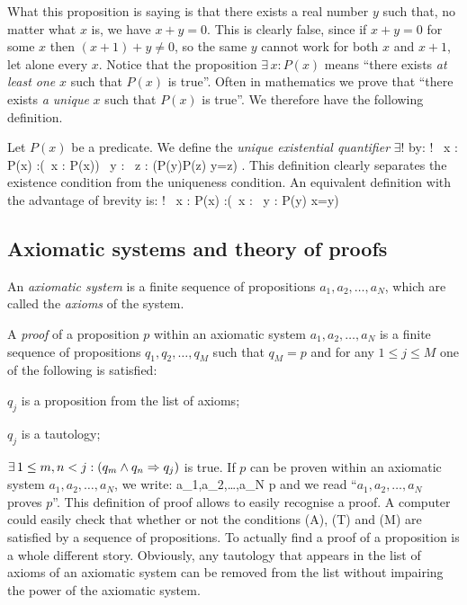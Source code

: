 What this proposition is saying is that there exists a real number $y$ such that, no matter what $x$ is, we have $x+y=0$.
This is clearly false, since if $x+y=0$ for some $x$ then $(x+1)+y\neq 0$, so the same $y$ cannot work for both $x$ and $x+1$, let alone every $x$.
\ee
Notice that the proposition $\exists \, x : P(x)$ means ``there exists \emph{at least one} $x$ such that $P(x)$ is true''. Often in mathematics we prove that ``there exists \emph{a unique} $x$ such that $P(x)$ is true''. We therefore have the following definition.

\bd
Let $P(x)$ be a predicate. We define the \emph{unique existential quantifier} $\exists !$ by:
\bse
\exists ! \, x : P(x) :\eqv (\exists \, x : P(x)) \land \forall \, y : \forall \, z : (P(y)\land P(z) \imp y=z) .
\ese
\ed
This definition clearly separates the existence condition from the uniqueness condition. An equivalent definition with the advantage of brevity is:
\bse
\exists ! \, x : P(x) :\eqv (\exists \, x : \forall \, y : P(y) \eqv x=y)
\ese

\subsection{Axiomatic systems and theory of proofs}

\bd
An \emph{axiomatic system} is a finite sequence of propositions $a_1,a_2,\ldots,a_N$, which are called the \emph{axioms} of the system.
\ed

\bd
A \emph{proof} of a proposition $p$ within an axiomatic system $a_1,a_2,\ldots,a_N$ is a finite sequence of propositions $q_1,q_2,\ldots,q_M$ such that $q_M=p$ and for any $1\leq j \leq M$ one of the following is satisfied:
\ben
\item[(A)] $q_j$ is a proposition from the list of axioms;
\item[(T)] $q_j$ is a tautology;
\item[(M)] $\exists \, 1\leq m,n <j : (q_m\land q_n \Rightarrow q_j)$ is true.
\een
\ed
\br
If $p$ can be proven within an axiomatic system $a_1,a_2,\ldots,a_N$, we write:
\bse
a_1,a_2,\ldots,a_N \vdash p
\ese
and we read ``$a_1,a_2,\ldots,a_N$ proves $p$''.
\er
\br
This definition of proof allows to easily recognise a proof.
A computer could easily check that whether or not the conditions (A), (T) and (M) are satisfied by a sequence of propositions.
To actually find a proof of a proposition is a whole different story.
\er
\br
Obviously, any tautology that appears in the list of axioms of an axiomatic system can be removed from the list without impairing the power of the axiomatic system.  
\er

